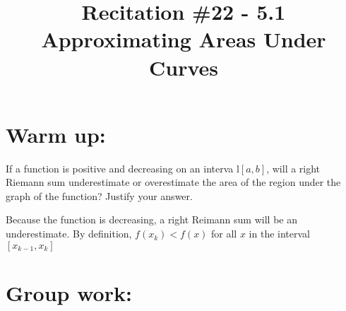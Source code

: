\documentclass[handout,nooutcomes]{ximera}
\title{Recitation \#22 - 5.1 Approximating Areas Under Curves}
\begin{document}
\begin{abstract}		\end{abstract}
\maketitle

\section*{Warm up:} 
If a function is positive and decreasing on an interva l$[a,b]$, will a right Riemann sum underestimate or overestimate the area of the region under the graph of the function? Justify your answer.
		\begin{freeResponse}
		Because the function is decreasing, a right Reimann sum will be an underestimate.  By definition, $f(x_k)< f(x)$ for all $x$ in the interval $[x_{k-1},x_k]$ 
		\end{freeResponse}	
		
		
		

	
	
	
	
	

\section*{Group work:}
\end{document}
